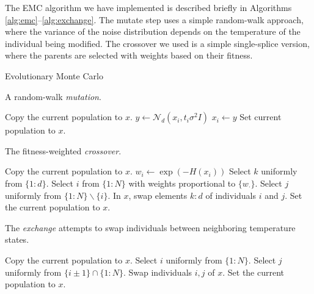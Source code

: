 \documentclass[12pt]{article}\usepackage[]{graphicx}\usepackage[]{color}
\begin{document}
The EMC algorithm we have implemented is described briefly in
Algorithms \ref{alg:emc}--\ref{alg:exchange}.  The mutate step uses a
simple random-walk approach, where the variance of the noise
distribution depends on the temperature of the individual being
modified.  The crossover we used is a simple single-splice version,
where the parents are selected with weights based on their fitness.


\begin{algorithm}
  \caption{Evolutionary Monte Carlo}
  \label{alg:emc}
  \footnotesize
  \begin{algorithmic}
      \State {} \Ow \State {}
    \EndWp
    \State {}
    \EndProcedure
\end{algorithmic}
\end{algorithm}


\begin{algorithm}
  \caption{A random-walk \emph{mutation}.}
  \label{alg:mutate}
  \footnotesize
  \begin{algorithmic}
  \State Copy the current population to $x$.   
  \State $y \gets \mathcal N_d(x_i,t_i \sigma^2I)$ 
  \State $x_i \gets y$
  \EndWp
  \EndFor
  \State Set current population to $x$.
  \EndProcedure
\end{algorithmic}
\end{algorithm}

\begin{algorithm}
  \caption{The fitness-weighted \emph{crossover}.}
  \label{alg:crossover}
  \footnotesize
  \begin{algorithmic}
   \State Copy the current population to $x$.   \State $w_i \gets \exp(-H(x_i))$
    \EndFor
    \State Select $k$ uniformly from $\{1\colon d\}.$ 
    \State Select $i$ from $\{1\colon N\}$ with weights proportional to $\{w_\cdot\}$.  
    \State Select $j$ uniformly from $\{1\colon N\} \backslash \{i\}.$ 
    \State In $x$, swap elements $k\colon d$ of individuals $i$ and $j$.  
    \Wp {$\cdots$} 
    \State Set the current population to $x$.
    \EndWp
    \EndProcedure
\end{algorithmic}
\end{algorithm}

\begin{algorithm}
  \caption{The \emph{exchange} attempts to swap individuals between neighboring temperature states.}
  \label{alg:exchange}
  \footnotesize
  \begin{algorithmic}
  \State Copy the current population to $x$.  
  \State Select $i$ uniformly from $\{1\colon N\}$.  
  \State Select $j$ uniformly from $\{i\pm 1\}\cap\{1\colon N\}$.  
  \State Swap individuals $i,j$ of $x$.  
  \State Set the current population to $x$.
    \EndWp
    \EndProcedure
\end{algorithmic}
\end{algorithm}
\end{document}
